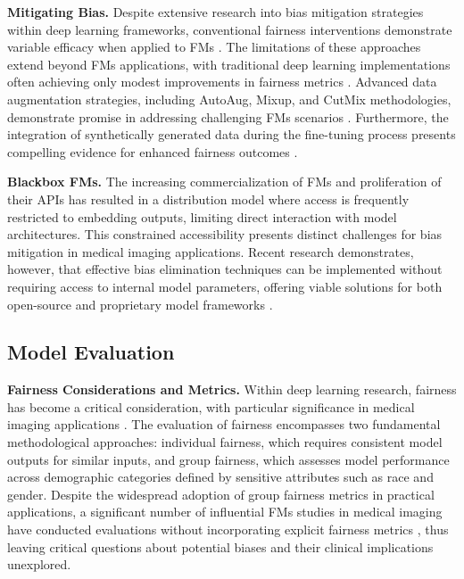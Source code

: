 \textbf{Mitigating Bias.} Despite extensive research into bias mitigation strategies within deep learning frameworks, conventional fairness interventions demonstrate variable efficacy when applied to FMs \cite{jin_fairmedfm_2024}. The limitations of these approaches extend beyond FMs applications, with traditional deep learning implementations often achieving only modest improvements in fairness metrics \cite{zong_medfair_2023}. Advanced data augmentation strategies, including AutoAug, Mixup, and CutMix methodologies, demonstrate promise in addressing challenging FMs scenarios \cite{cui_classes_nodate}. Furthermore, the integration of synthetically generated data during the fine-tuning process presents compelling evidence for enhanced fairness outcomes \cite{ktena_generative_2023}.

\textbf{Blackbox FMs.} The increasing commercialization of FMs and proliferation of their APIs has resulted in a distribution model where access is frequently restricted to embedding outputs, limiting direct interaction with model architectures. This constrained accessibility presents distinct challenges for bias mitigation in medical imaging applications. Recent research demonstrates, however, that effective bias elimination techniques can be implemented without requiring access to internal model parameters, offering viable solutions for both open-source and proprietary model frameworks \cite{jin_universal_2024}.


\subsection{Model Evaluation}
\label{Model Evaluation}
\textbf{Fairness Considerations and Metrics.} Within deep learning research, fairness has become a critical consideration, with particular significance in medical imaging applications \cite{chen_algorithmic_2023, xu_addressing_2024, ricci_lara_addressing_2022, shi_survey_2024, vaidya_demographic_2024}. The evaluation of fairness encompasses two fundamental methodological approaches: individual fairness, which requires consistent model outputs for similar inputs, and group fairness, which assesses model performance across demographic categories defined by sensitive attributes such as race and gender. Despite the widespread adoption of group fairness metrics in practical applications, a significant number of influential FMs studies in medical imaging have conducted evaluations without incorporating explicit fairness metrics \cite{azizi_robust_2023, zhou_foundation_2023, lu_visual-language_2024, zhao_foundation_2024}, thus leaving critical questions about potential biases and their clinical implications unexplored.


